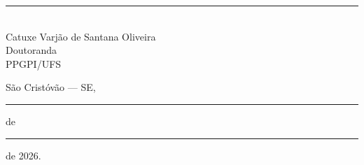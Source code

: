 \documentclass[12pt,a4paper,brazil]{article}
\begin{document}
\vspace{2cm}

\noindent
\begin{center}
\begin{minipage}[t]{0.45\textwidth}
\centering
\rule{6cm}{0.4pt}\\
Catuxe Varjão de Santana Oliveira\\
Doutoranda\\
PPGPI/UFS
\end{minipage}
\end{center}

\vspace{1cm}
\noindent
São Cristóvão --- SE, \rule{2cm}{0.4pt} de \rule{3cm}{0.4pt} de 2026.
\end{document}
